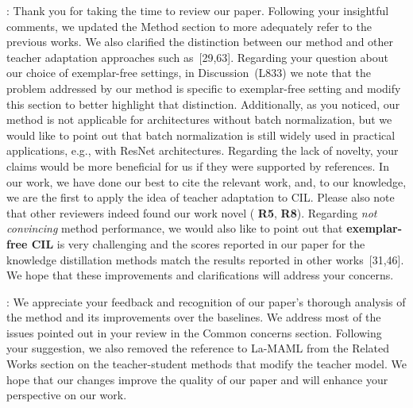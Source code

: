 \documentclass[10pt,twocolumn,letterpaper]{article}
\newcommand{\Rfour}{{\bfseries\color{orange} R4}}
\newcommand{\Rfive}{{\bfseries\color{teal} R5}}
\newcommand{\Reight}{{\bfseries\color{magenta} R8}}
\newcommand\todo[1]{{\color{red} [\bf TODO: #1]}}
\begin{document}

\noindent \Rfour: Thank you for taking the time to review our paper. 
Following your insightful comments, we updated the Method section to more adequately refer to the previous works. We also clarified the distinction between our method and other teacher adaptation approaches such as~[29,63]. 
Regarding your question about our choice of exemplar-free settings, in Discussion~(L833) we note that the problem addressed by our method is specific to exemplar-free setting and modify this section to better highlight that distinction.
Additionally, as you noticed, our method is not applicable for architectures without batch normalization, but we would like to point out that batch normalization is still widely used in practical applications, e.g., with ResNet architectures.
Regarding the lack of novelty, your claims would be more beneficial for us if they were supported by references. 
In our work, we have done our best to cite the relevant work, and, to our knowledge, we are the first to apply the idea of teacher adaptation to CIL. Please also note that other reviewers indeed found our work novel (\Rfive, \Reight). 
Regarding \textit{not convincing} method performance, we would also like to point out that \textbf{exemplar-free CIL} is very challenging and the scores reported in our paper for the knowledge distillation methods match the results reported in other works~[31,46]. 
We hope that these improvements and clarifications will address your concerns.%

\noindent \Rfive: We appreciate your feedback and recognition of our paper's thorough analysis of the method and its improvements over the baselines. We address most of the issues pointed out in your review in the Common concerns section. Following your suggestion, we also removed the reference to La-MAML from the Related Works section on the teacher-student methods that modify the teacher model. 
We hope that our changes improve the quality of our paper and will enhance your perspective on our work.
\end{document}
